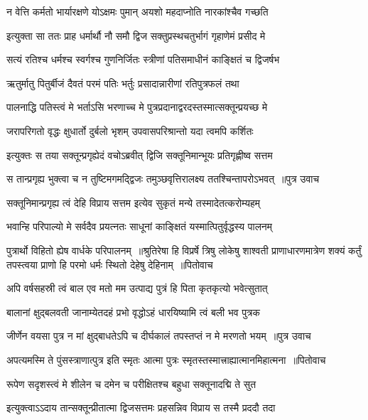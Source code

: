 \twolineshloka
{न वेत्ति कर्मतो भार्यारक्षणे योऽक्षमः पुमान्}
{अयशो महदाप्नोति नारकांश्चैव गच्छति}


\twolineshloka
{इत्युक्ता सा ततः प्राह धर्मार्थौ नौ समौ द्विज}
{सक्तुप्रस्थचतुर्भागं गृहाणेमं प्रसीद मे}


\twolineshloka
{सत्यं रतिश्च धर्मश्च स्वर्गश्च गुणनिर्जितः}
{स्त्रीणां पतिसमाधीनं काङ्क्षितं च द्विजर्षभ}


\twolineshloka
{ऋतुर्मातु पितुर्बीजं दैवतं परमं पतिः}
{भर्तुः प्रसादान्नारीणां रतिपुत्रफलं तथा}


\twolineshloka
{पालनाद्धि पतिस्त्वं मे भर्ताऽसि भरणाच्च मे}
{पुत्रप्रदानाद्वरदस्तस्मात्सक्तून्प्रयच्छ मे}


\twolineshloka
{जरापरिगतो वृद्धः क्षुधार्तो दुर्बलो भृशम्}
{उपवासपरिश्रान्तो यदा त्वमपि कर्शितः}


\twolineshloka
{इत्युक्तः स तया सक्तून्प्रगृह्येदं वचोऽब्रवीत्}
{द्विजि सक्तूनिमान्भूयः प्रतिगृह्णीष्व सत्तम}


\threelineshloka
{स तान्प्रगृह्य भुक्त्वा च न तुष्टिमगमद्द्विजः}
{तमुञ्छवृत्तिरालक्ष्य ततश्चिन्तापरोऽभवत् ॥पुत्र उवाच}
{}


\twolineshloka
{सक्तूनिमान्प्रगृह्य त्वं देहि विप्राय सत्तम}
{इत्येव सुकृतं मन्ये तस्मादेतत्करोम्यहम्}


\twolineshloka
{भवान्हि परिपाल्यो मे सर्वदैव प्रयत्नतः}
{साधूनां काङ्क्षितं यस्मात्पितुर्वृद्धस्य पालनम्}


पुत्रार्थो विहितो ह्येष वार्धके परिपालनम् ॥श्रुतिरेषा हि विप्रर्षे त्रिषु लोकेषु शाश्वती
\threelineshloka
{प्राणाधारणमात्रेण शक्यं कर्तुं तपस्त्वया}
{प्राणो हि परमो धर्मः स्थितो देहेषु देहिनाम् ॥पितोवाच}
{}


\twolineshloka
{अपि वर्षसहस्री त्वं बाल एव मतो मम}
{उत्पाद्य पुत्रं हि पिता कृतकृत्यो भवेत्सुतात्}


\twolineshloka
{बालानां क्षुद्बलवती जानाम्येतदहं प्रभो}
{वृद्धोऽहं धारयिष्यामि त्वं बली भव पुत्रक}


\threelineshloka
{जीर्णेन वयसा पुत्र न मां क्षुद्बाधतेऽपि च}
{दीर्घकालं तपस्तप्तं न मे मरणतो भयम् ॥पुत्र उवाच}
{}


\threelineshloka
{अपत्यमस्मि ते पुंसस्त्राणात्पुत्र इति स्मृतः}
{आत्मा पुत्रः स्मृतस्तस्मात्त्राह्यात्मानमिहात्मना ॥पितोवाच}
{}


\twolineshloka
{रूपेण सदृशस्त्वं मे शीलेन च दमेन च}
{परीक्षितश्च बहुधा सक्तूनादद्मि ते सुत}


\twolineshloka
{इत्युक्त्वाऽऽदाय तान्सक्तून्प्रीतात्मा द्विजसत्तमः}
{प्रहसन्निव विप्राय स तस्मै प्रददौ तदा}



